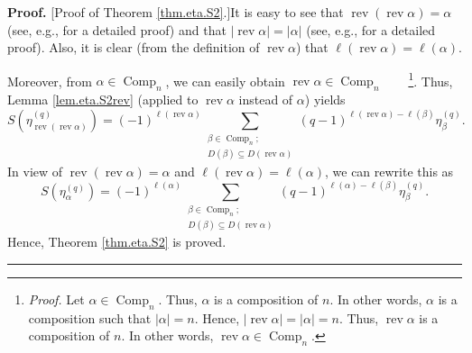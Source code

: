 \documentclass[numbers=enddot,12pt,final,onecolumn,notitlepage]{scrartcl}%
\theoremstyle{definition}
\newenvironment{proof}[1][Proof]{\noindent\textbf{#1.} }{\ \rule{0.5em}{0.5em}}
\let\sumnonlimits\sum
\renewcommand{\sum}{\sumnonlimits\limits}
\newenvironment{verlong}{}{}
\begin{document}
\begin{verlong}


\begin{proof}
[Proof of Theorem \ref{thm.eta.S2}.]It is easy to see that
$\operatorname*{rev}\left(  \operatorname*{rev}\alpha\right)  =\alpha$ (see,
e.g., \cite[Proposition 3.4]{comps} for a detailed proof) and that $\left\vert
\operatorname*{rev}\alpha\right\vert =\left\vert \alpha\right\vert $ (see,
e.g., \cite[Proposition 3.3]{comps} for a detailed proof). Also, it is clear
(from the definition of $\operatorname*{rev}\alpha$) that $\ell\left(
\operatorname*{rev}\alpha\right)  =\ell\left(  \alpha\right)  $.

Moreover, from $\alpha\in\operatorname*{Comp}\nolimits_{n}$, we can easily
obtain $\operatorname*{rev}\alpha\in\operatorname*{Comp}\nolimits_{n}%
$\ \ \ \ \footnote{\textit{Proof.} Let $\alpha\in\operatorname*{Comp}%
\nolimits_{n}$. Thus, $\alpha$ is a composition of $n$. In other words,
$\alpha$ is a composition such that $\left\vert \alpha\right\vert =n$. Hence,
$\left\vert \operatorname*{rev}\alpha\right\vert =\left\vert \alpha\right\vert
=n$. Thus, $\operatorname*{rev}\alpha$ is a composition of $n$. In other
words, $\operatorname*{rev}\alpha\in\operatorname*{Comp}\nolimits_{n}$.}.
Thus, Lemma \ref{lem.eta.S2rev} (applied to $\operatorname*{rev}\alpha$
instead of $\alpha$) yields%
\[
S\left(  \eta_{\operatorname*{rev}\left(  \operatorname*{rev}\alpha\right)
}^{\left(  q\right)  }\right)  =\left(  -1\right)  ^{\ell\left(
\operatorname*{rev}\alpha\right)  }\sum_{\substack{\beta\in
\operatorname*{Comp}\nolimits_{n};\\D\left(  \beta\right)  \subseteq D\left(
\operatorname*{rev}\alpha\right)  }}\left(  q-1\right)  ^{\ell\left(
\operatorname*{rev}\alpha\right)  -\ell\left(  \beta\right)  }\eta_{\beta
}^{\left(  q\right)  }.
\]
In view of $\operatorname*{rev}\left(  \operatorname*{rev}\alpha\right)
=\alpha$ and $\ell\left(  \operatorname*{rev}\alpha\right)  =\ell\left(
\alpha\right)  $, we can rewrite this as%
\[
S\left(  \eta_{\alpha}^{\left(  q\right)  }\right)  =\left(  -1\right)
^{\ell\left(  \alpha\right)  }\sum_{\substack{\beta\in\operatorname*{Comp}%
\nolimits_{n};\\D\left(  \beta\right)  \subseteq D\left(  \operatorname*{rev}%
\alpha\right)  }}\left(  q-1\right)  ^{\ell\left(  \alpha\right)  -\ell\left(
\beta\right)  }\eta_{\beta}^{\left(  q\right)  }.
\]
Hence, Theorem \ref{thm.eta.S2} is proved.
\end{proof}
\end{verlong}
\end{document}
